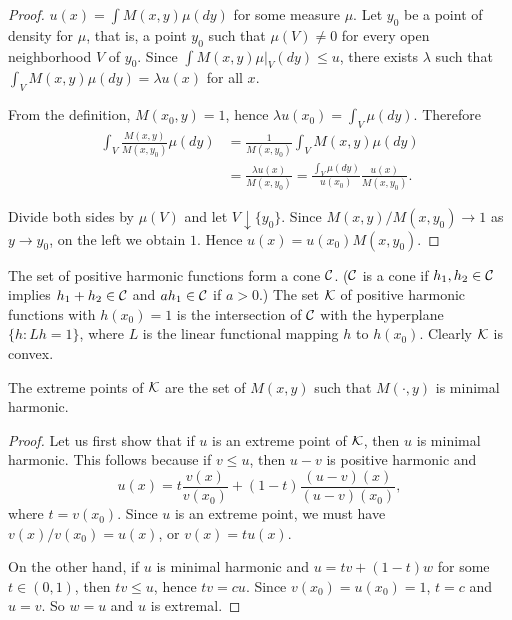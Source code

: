 \begin{proof}
$u(x) = \int M(x,y)\mu(dy)$ for some measure $\mu$. Let $y_0$ be a point of density for $\mu$, that is, a point $y_0$ such that $\mu(V) \neq 0$ for every open neighborhood $V$ of $y_0$. Since $\int M(x,y)\mu|_V(dy) \leq u$, there exists $\lambda$ such that $\int_V M(x,y)\mu(dy) = \lambda u(x)$ for all $x$.

From the definition, $M(x_0,y) = 1$, hence $\lambda u(x_0) = \int_V \mu(dy)$. Therefore
\begin{align*}
    \int_V \frac{M(x,y)}{M(x,y_0)}\mu(dy) &=\frac{1}{M(x,y_0)}\int_V M(x,y)\mu(dy) \\
    &= \frac{\lambda u(x)}{M(x,y_0)}= \frac{\int_V \mu(dy)}{u(x_0)} \frac{u(x)}{M(x,y_0)}.
\end{align*}

Divide both sides by $\mu(V)$ and let $V \downarrow \{y_0\}$. Since $M(x,y)/M(x,y_0) \to 1$ as $y \to y_0$, on the left we obtain $1$. Hence $u(x) = u(x_0)M(x,y_0)$.
\end{proof}

The set of positive harmonic functions form a cone $\mathcal{C}$. ($\mathcal{C}$ is a cone if $h_1,h_2 \in \mathcal{C}$ implies $h_1 + h_2 \in \mathcal{C}$ and $ah_1 \in \mathcal{C}$ if $a > 0$.) The set $\mathcal{K}$ of positive harmonic functions with $h(x_0) = 1$ is the intersection of $\mathcal{C}$ with the hyperplane $\{h : Lh = 1\}$, where $L$ is the linear functional mapping $h$ to $h(x_0)$. Clearly $\mathcal{K}$ is convex.

\mpagebreak

\begin{proposition}\label{prop:ch2_7.6}
The extreme points of $\mathcal{K}$ are the set of $M(x,y)$ such that $M(\cdot,y)$ is minimal harmonic.
\end{proposition}

\begin{proof}
Let us first show that if $u$ is an extreme point of $\mathcal{K}$, then $u$ is minimal
harmonic. This follows because if $v \leq u$, then $u - v$ is positive harmonic
and
\[
    u(x) = t\frac{v(x)}{v(x_0)} + (1-t)\frac{(u-v)(x)}{(u-v)(x_0)},
\]
where $t = v(x_0)$. Since $u$ is an extreme point, we must have $v(x)/v(x_0) = u(x)$, or $v(x) = tu(x)$.

On the other hand, if $u$ is minimal harmonic and $u = tv + (1-t)w$ for some $t \in (0,1)$, then $tv \leq u$, hence $tv = cu$. Since $v(x_0) = u(x_0) = 1$, $t = c$ and $u = v$. So $w = u$ and $u$ is extremal.
\end{proof}

